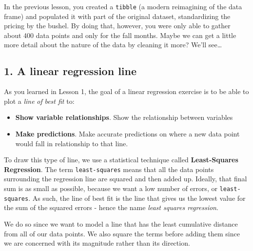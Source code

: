 \documentclass[
]{article}
\begin{document}
In the previous lesson, you created a \texttt{tibble} (a modern
reimagining of the data frame) and populated it with part of the
original dataset, standardizing the pricing by the bushel. By doing
that, however, you were only able to gather about 400 data points and
only for the fall months. Maybe we can get a little more detail about
the nature of the data by cleaning it more? We'll see\ldots{} 🕵️‍♀️

\hypertarget{a-linear-regression-line}{%
\subsection{1. A linear regression
line}\label{a-linear-regression-line}}

As you learned in Lesson 1, the goal of a linear regression exercise is
to be able to plot a \emph{line} \emph{of} \emph{best fit} to:

\begin{itemize}
\item
  \textbf{Show variable relationships}. Show the relationship between
  variables
\item
  \textbf{Make predictions}. Make accurate predictions on where a new
  data point would fall in relationship to that line.
\end{itemize}

To draw this type of line, we use a statistical technique called
\textbf{Least-Squares Regression}. The term \texttt{least-squares} means
that all the data points surrounding the regression line are squared and
then added up. Ideally, that final sum is as small as possible, because
we want a low number of errors, or \texttt{least-squares}. As such, the
line of best fit is the line that gives us the lowest value for the sum
of the squared errors - hence the name \emph{least squares regression}.

We do so since we want to model a line that has the least cumulative
distance from all of our data points. We also square the terms before
adding them since we are concerned with its magnitude rather than its
direction.
\end{document}
